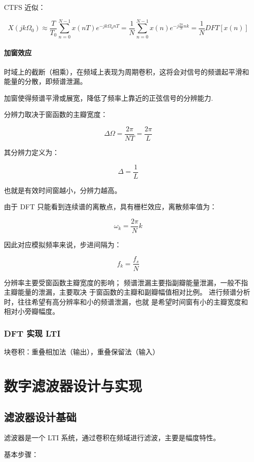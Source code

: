 \documentclass[cn,11pt,chinese,black,simple]{elegantbook}
\begin{document}
CTFS 近似：

\[
X\left(j k \Omega_{0}\right) \approx \frac{T}{T_{0}} \sum_{n=0}^{N-1} x(n T) e^{-j k \Omega_{0} n T}=\frac{1}{N} \sum_{n=0}^{N-1} x(n) e^{-j \frac{2 \pi}{N} n k}=\frac{1}{N} D F T[x(n)]
\]

\subsubsection{加窗效应}

时域上的截断（相乘），在频域上表现为周期卷积，这将会对信号的频谱起平滑和能量的分散，即频谱泄漏。

加窗使得频谱平滑或展宽，降低了频率上靠近的正弦信号的分辨能力.

分辨力取决于窗函数的主瓣宽度：

\[\Delta\Omega = \frac{2\pi}{NT} = \frac{2\pi}{L}\]

其分辨力定义为：

\[\Delta = \frac{1}{L}\]

也就是有效时间窗越小，分辨力越高。

由于 DFT 只能看到连续谱的离散点，具有栅栏效应，离散频率值为：

\[\omega_k = \frac{2\pi}{N} k\]

因此对应模拟频率来说，步进间隔为：

\[f_k = \frac{f_s}{N}\]

分辨率主要受窗函数主瓣宽度的影响；
频谱泄漏主要指副瓣能量泄漏，一般不指主瓣能量的泄漏，主要取决
于窗函数的主瓣和副瓣幅值相对比例。
进行频谱分析时，往往希望有高分辨率和小的频谱泄漏，也就
是希望时间窗有小的主瓣宽度和相对小旁瓣幅度。


\subsection{DFT 实现 LTI}

块卷积：重叠相加法（输出），重叠保留法（输入）


\chapter{数字滤波器设计与实现}

\section{滤波器设计基础}

滤波器是一个 LTI 系统，通过卷积在频域进行滤波，主要是幅度特性。

基本步骤：
\end{document}
